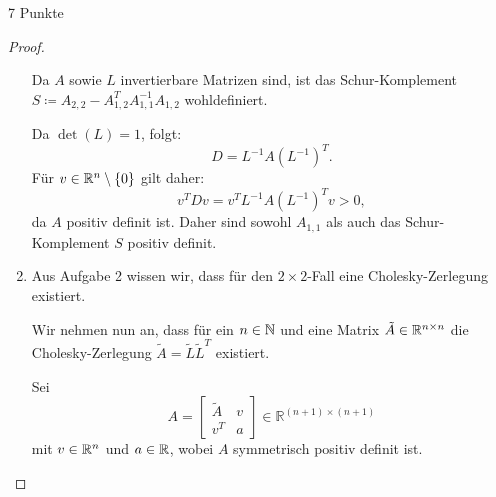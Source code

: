 \documentclass{problemset}
\begin{document}
\begin{problem}{7 Punkte}
\begin{proof}
\begin{enumerate}
              Da \( A \) sowie \( L \) invertierbare Matrizen sind, ist das
              Schur-Komplement \( S \coloneq A_{2,2} - A_{1,2}^T A_{1,1}^{-1}
              A_{1,2} \) wohldefiniert.

              Da \(\det(L) = 1\), folgt:
              \[
                  D = L^{-1} A {\left(L^{-1}\right)}^T.
              \]
              Für \(v \in \mathbb{R}^n \setminus \{0\}\) gilt daher:
              \[
                  v^T D v = v^T L^{-1} A {\left(L^{-1}\right)}^T v > 0,
              \]
              da \( A \) positiv definit ist. Daher sind sowohl \( A_{1,1} \)
              als auch das Schur-Komplement \( S \) positiv definit.

        \item Aus Aufgabe 2 wissen wir, dass für den \(2 \times 2\)-Fall eine
              Cholesky-Zerlegung existiert.

              Wir nehmen nun an, dass für ein \( n \in \mathbb{N} \) und eine Matrix
              \( \tilde{A} \in \mathbb{R}^{n \times n} \) die Cholesky-Zerlegung \(
              \tilde{A} = \tilde{L} \tilde{L}^T \) existiert.

              Sei
              \begin{equation*}
                  A = \begin{bmatrix}
                      \tilde{A} & v \\
                      v^T       & a
                  \end{bmatrix} \in \mathbb{R}^{(n+1) \times (n+1)}
              \end{equation*}
              mit \( v \in \mathbb{R}^n \) und \( a \in \mathbb{R} \), wobei \(
              A \) symmetrisch positiv definit ist.


\end{enumerate}
\end{proof}
\end{problem}
\end{document}
